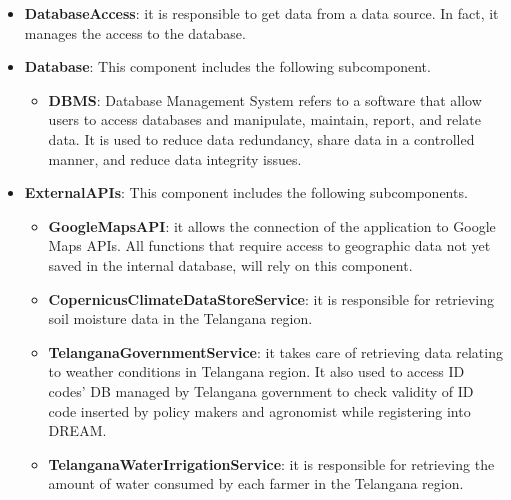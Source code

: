 \begin{itemize}
\item \textbf{DatabaseAccess}: it is responsible to get data from a data source. In fact, it manages the access to the database.

\item \textbf{Database}: This component includes the following subcomponent.

\begin{itemize}
    \item \textbf{DBMS}: Database Management System refers to a software that allow users to access databases and manipulate, maintain, report, and relate data. It is used to reduce data redundancy, share data in a controlled manner, and reduce data integrity issues.
\end{itemize}

\item \textbf{ExternalAPIs}: This component includes the following subcomponents.

\begin{itemize}
    \item \textbf{GoogleMapsAPI}: it allows the connection of the application to Google Maps APIs. All functions that require access to geographic data not yet saved in the internal database, will rely on this component.
    \item \textbf{CopernicusClimateDataStoreService}: it is responsible for retrieving soil moisture data in the Telangana region.
    \item \textbf{TelanganaGovernmentService}: it takes care of retrieving data relating to weather conditions in Telangana region. It also used to access ID codes' DB managed by Telangana government to check validity of ID code inserted by policy makers and agronomist while registering into DREAM. 
    \item \textbf{TelanganaWaterIrrigationService}: it is responsible for retrieving the amount of water consumed by each farmer in the Telangana region.
\end{itemize}

\end{itemize}


\def\fillandplacepagenumber{%
 \par\pagestyle{empty}%
\vbox to 0pt{\vss}\vfill
\vbox to 0pt{\baselineskip0pt
   \hbox to\linewidth{\hss}%
   \setlength{\footskip}{70pt}
   \baselineskip\footskip
   \hbox to\linewidth{%
     \hfil\thepage\hfil}\vss}}

